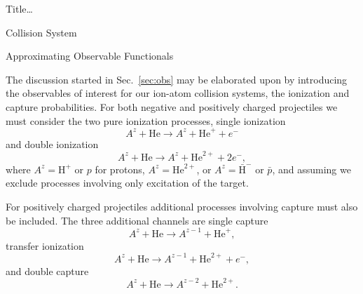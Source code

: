 \documentclass[letterpaper, 11 pt]{report}
\begin{document}
\begin{chapter}{ Title\dots \label{chap:p-he2p-he}}
\begin{section}{Collision System \label{sec:p-he2p-he-sys}}
   \end{section}

   \begin{section}{Approximating Observable Functionals \label{sec:phe2p-obs}}

      The discussion started in Sec.~\ref{sec:obs} may be elaborated upon by introducing the observables
      of interest for our ion-atom collision systems, the ionization and capture probabilities. For both
      negative and positively charged projectiles we must consider the two pure ionization processes,
      single ionization
      \begin{equation} \label{eq:TI}
         A^z + \mathrm{He} \rightarrow A^z + \mathrm{He}^+ + e^-
      \end{equation}
      and double ionization
      \begin{equation} \label{eq:II}
         A^z + \mathrm{He} \rightarrow A^z + \mathrm{He}^{2+} + 2e^-,
      \end{equation}
      where $A^z = \mathrm{H}^+$ or $p$ for protons, $A^z = \mathrm{He}^{2+}$, or $A^z =
      \bar{\mathrm{H}}^-$ or $\bar{p}$, and assuming we exclude processes involving only excitation of
      the target.

      For positively charged projectiles additional processes involving capture must also be included.
      The three additional channels are single capture
      \begin{equation} \label{eq:TP}
         A^z + \mathrm{He} \rightarrow A^{z-1} + \mathrm{He}^{+},
      \end{equation}
      transfer ionization
      \begin{equation} \label{eq:IP}
         A^z + \mathrm{He} \rightarrow A^{z-1} + \mathrm{He}^{2+} + e^-,
      \end{equation}
      and double capture
      \begin{equation} \label{eq:PP}
         A^z + \mathrm{He} \rightarrow A^{z-2} + \mathrm{He}^{2+}.
      \end{equation}


\end{section}
\end{chapter}
\end{document}
